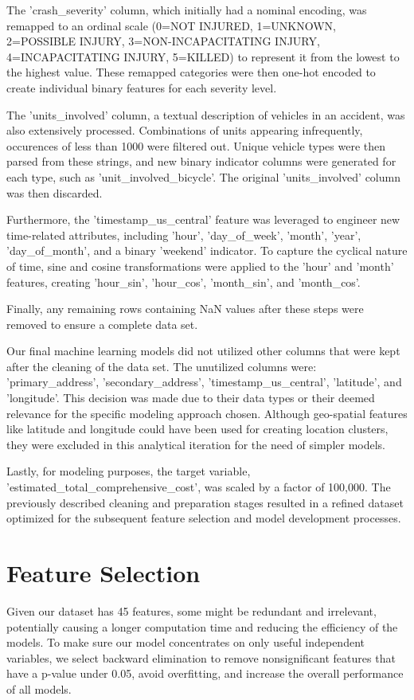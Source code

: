 \documentclass[conference]{IEEEtran}
\begin{document}
The 'crash\_severity' column, which initially had a nominal encoding, was remapped to an ordinal scale (0=NOT INJURED, 1=UNKNOWN, 2=POSSIBLE INJURY, 3=NON-INCAPACITATING INJURY, 4=INCAPACITATING INJURY, 5=KILLED) to represent it from the lowest to the highest value. These remapped categories were then one-hot encoded to create individual binary features for each severity level. 

The 'units\_involved' column, a textual description of vehicles in an accident, was also extensively processed. Combinations of units appearing infrequently, occurences of less than 1000 were filtered out. Unique vehicle types were then parsed from these strings, and new binary indicator columns were generated for each type, such as 'unit\_involved\_bicycle'. The original 'units\_involved' column was then discarded. 

Furthermore, the 'timestamp\_us\_central' feature was leveraged to engineer new time-related attributes, including 'hour', 'day\_of\_week', 'month', 'year', 'day\_of\_month', and a binary 'weekend' indicator. To capture the cyclical nature of time, sine and cosine transformations were applied to the 'hour' and 'month' features, creating 'hour\_sin', 'hour\_cos', 'month\_sin', and 'month\_cos'. 

Finally, any remaining rows containing NaN values after these steps were removed to ensure a complete data set.

Our final machine learning models did not utilized other columns that were kept after the cleaning of the data set. The unutilized columns were: 'primary\_address', 'secondary\_address', 'timestamp\_us\_central', 'latitude', and 'longitude'. This decision was made due to their data types or their deemed relevance for the specific modeling approach chosen. Although geo-spatial features like latitude and longitude could have been used for creating location clusters, they were excluded in this analytical iteration for the need of simpler models. 

Lastly, for modeling purposes, the target variable, 'estimated\_total\_comprehensive\_cost', was scaled by a factor of 100,000. The previously described cleaning and preparation stages resulted in a refined dataset optimized for the subsequent feature selection and model development processes.

\section{Feature Selection}
Given our dataset has 45 features, some might be redundant and irrelevant, potentially causing a longer computation time and reducing the efficiency of the models. To make sure our model concentrates on only useful independent variables, we select backward elimination to remove nonsignificant features that have a p-value under 0.05, avoid overfitting, and increase the overall performance of all models. 
\end{document}
